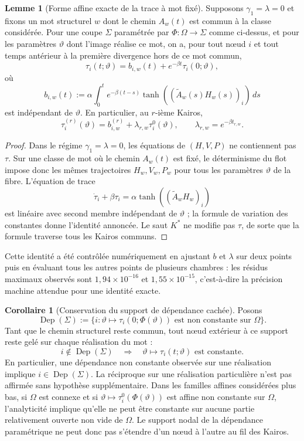 \documentclass[11pt,a4paper]{article}
\theoremstyle{definition}
\newtheorem{lemma}[definition]{Lemme}
\newtheorem{corollary}[definition]{Corollaire}
\theoremstyle{remark}
\begin{document}
\begin{lemma}[Forme affine exacte de la trace à mot fixé]
\label{lem:trace-affine-chambre}
Supposons $\gamma_1=\lambda=0$ et fixons un mot structurel $w$ dont le chemin $A_w(t)$ est commun à la classe considérée. Pour une coupe $\Sigma$ paramétrée par $\Phi:\Omega\to\Sigma$ comme ci-dessus, et pour les paramètres $\vartheta$ dont l'image réalise ce mot, on a, pour tout nœud $i$ et tout temps antérieur à la première divergence hors de ce mot commun,
\[
 \boxed{
 \tau_i(t;\vartheta)
 =b_{i,w}(t)+e^{-\beta t}\tau_i(0;\vartheta),}
\]
où
\[
 b_{i,w}(t)
 :=\alpha\int_0^t e^{-\beta(t-s)}
 \tanh\!\left((\widetilde A_w(s)H_w(s))_i\right)\,ds
\]
est indépendant de $\vartheta$. En particulier, au $r$-ième Kairos,
\[
 \tau_i^{(r)}(\vartheta)
 =b_{i,w}^{(r)}+\lambda_{r,w}\tau_i^0(\vartheta),
 \qquad
 \lambda_{r,w}=e^{-\beta t_{r,w}}.
\]
\end{lemma}

\begin{proof}
Dans le régime $\gamma_1=\lambda=0$, les équations de $(H,V,P)$ ne contiennent pas $\tau$. Sur une classe de mot où le chemin $A_w(t)$ est fixé, le déterminisme du flot impose donc les mêmes trajectoires $H_w,V_w,P_w$ pour tous les paramètres $\vartheta$ de la fibre. L'équation de trace
\[
 \dot\tau_i+\beta\tau_i
 =\alpha\tanh\!\left((\widetilde A_w H_w)_i\right)
\]
est linéaire avec second membre indépendant de $\vartheta$ ; la formule de variation des constantes donne l'identité annoncée. Le saut $K^*$ ne modifie pas $\tau$, de sorte que la formule traverse tous les Kairos communs.
\end{proof}

Cette identité a été contrôlée numériquement en ajustant $b$ et $\lambda$ sur deux points puis en évaluant tous les autres points de plusieurs chambres : les résidus maximaux observés sont $1{,}94\times10^{-16}$ et $1{,}55\times10^{-15}$, c'est-à-dire la précision machine attendue pour une identité exacte.

\begin{corollary}[Conservation du support de dépendance cachée]
Posons
\[
 \operatorname{Dep}(\Sigma):=\{i:\vartheta\mapsto\tau_i(0;\Phi(\vartheta))\text{ est non constante sur }\Omega\}.
\]
Tant que le chemin structurel reste commun, tout nœud extérieur à ce support reste gelé sur chaque réalisation du mot :
\[
 i\notin\operatorname{Dep}(\Sigma)
 \quad\Longrightarrow\quad
 \vartheta\mapsto\tau_i(t;\vartheta)\text{ est constante}.
\]
En particulier, une dépendance non constante observée sur une réalisation implique $i\in\operatorname{Dep}(\Sigma)$. La réciproque sur une réalisation particulière n'est pas affirmée sans hypothèse supplémentaire. Dans les familles affines considérées plus bas, si $\Omega$ est connexe et si $\vartheta\mapsto\tau_i^0(\Phi(\vartheta))$ est affine non constante sur $\Omega$, l'analyticité implique qu'elle ne peut être constante sur aucune partie relativement ouverte non vide de $\Omega$. Le support nodal de la dépendance paramétrique ne peut donc pas s'étendre d'un nœud à l'autre au fil des Kairos.
\end{corollary}
\end{document}
